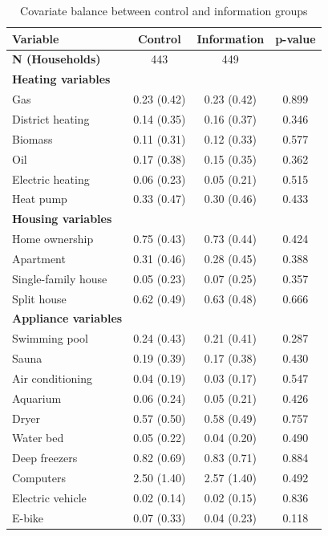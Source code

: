 \begin{table}[H]
\centering
\caption{Covariate balance between control and information groups}
\label{table:balance_check}
\begin{tabular}{lccc}
\toprule
Variable & Control & Information & p-value \\
\midrule

\textbf{N (Households)} & 443 & 449 &  \\

\midrule
\textbf{Heating variables} \\
Gas & 0.23 (0.42) & 0.23 (0.42) & 0.899 \\
District heating & 0.14 (0.35) & 0.16 (0.37) & 0.346 \\
Biomass & 0.11 (0.31) & 0.12 (0.33) & 0.577 \\
Oil & 0.17 (0.38) & 0.15 (0.35) & 0.362 \\
Electric heating & 0.06 (0.23) & 0.05 (0.21) & 0.515 \\
Heat pump & 0.33 (0.47) & 0.30 (0.46) & 0.433 \\

\midrule
\textbf{Housing variables} \\
Home ownership & 0.75 (0.43) & 0.73 (0.44) & 0.424 \\
Apartment & 0.31 (0.46) & 0.28 (0.45) & 0.388 \\
Single-family house & 0.05 (0.23) & 0.07 (0.25) & 0.357 \\
Split house & 0.62 (0.49) & 0.63 (0.48) & 0.666 \\

\midrule
\textbf{Appliance variables} \\
Swimming pool & 0.24 (0.43) & 0.21 (0.41) & 0.287 \\
Sauna & 0.19 (0.39) & 0.17 (0.38) & 0.430 \\
Air conditioning & 0.04 (0.19) & 0.03 (0.17) & 0.547 \\
Aquarium & 0.06 (0.24) & 0.05 (0.21) & 0.426 \\
Dryer & 0.57 (0.50) & 0.58 (0.49) & 0.757 \\
Water bed & 0.05 (0.22) & 0.04 (0.20) & 0.490 \\
Deep freezers & 0.82 (0.69) & 0.83 (0.71) & 0.884 \\
Computers & 2.50 (1.40) & 2.57 (1.40) & 0.492 \\
Electric vehicle & 0.02 (0.14) & 0.02 (0.15) & 0.836 \\
E-bike & 0.07 (0.33) & 0.04 (0.23) & 0.118 \\


\end{tabular}
\end{table}
